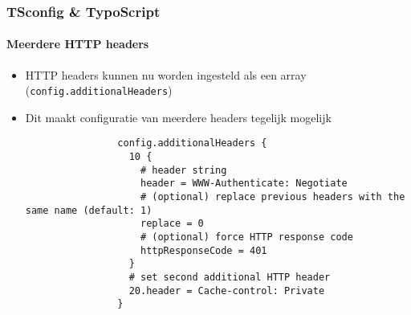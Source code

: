 
\begin{frame}[fragile]
	\frametitle{TSconfig \& TypoScript}
	\framesubtitle{Meerdere HTTP headers}

	\begin{itemize}

		\item HTTP headers kunnen nu worden ingesteld als een array (\small\texttt{config.additionalHeaders}\normalsize)
		\item Dit maakt configuratie van meerdere headers tegelijk mogelijk

			\begin{lstlisting}
				config.additionalHeaders {
				  10 {
				    # header string
				    header = WWW-Authenticate: Negotiate
				    # (optional) replace previous headers with the same name (default: 1)
				    replace = 0
				    # (optional) force HTTP response code
				    httpResponseCode = 401
				  }
				  # set second additional HTTP header
				  20.header = Cache-control: Private
				}
			\end{lstlisting}

	\end{itemize}

\end{frame}


